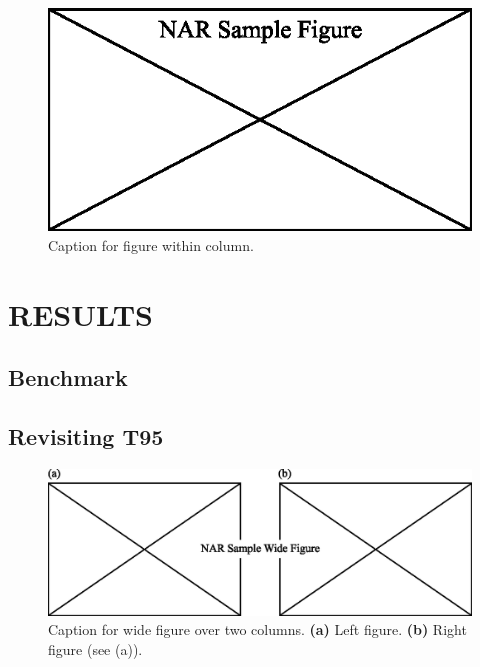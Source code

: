 \documentclass[a4,center,fleqn]{NAR}
\begin{document}
\begin{figure}[t]
\begin{center}
\includegraphics{NAR-fig1.eps}
\end{center}
\caption{Caption for figure within column.}
\label{NAR-fig1}
\end{figure}


\section{RESULTS}

\subsection{Benchmark}
\lipsum

\subsection{Revisiting T95}
\lipsum


\begin{figure}[t]
\begin{center}
\includegraphics{NAR-fig2.eps}
\end{center}
\caption{Caption for wide figure over two columns.
\textbf{(a)} Left figure.
\textbf{(b)} Right figure (see (a)).
}
\label{NAR-fig2}
\end{figure}
\end{document}
